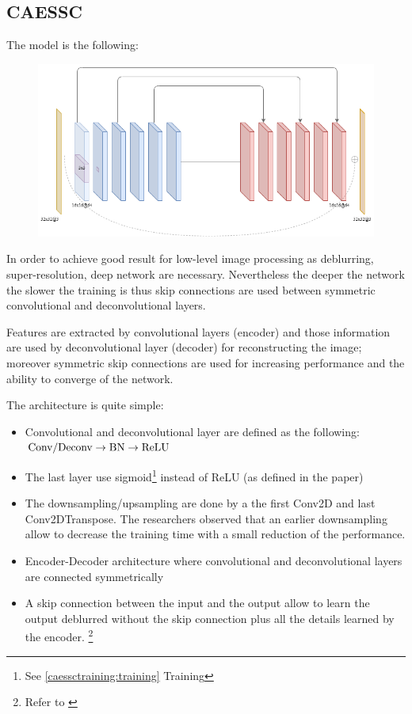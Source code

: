 \subsection{CAESSC}
The model is the following:
\begin{figure}[H]
    \centering
    \includegraphics[scale=0.4]{subsections/caessc/caessc.png}
\end{figure}

In order to achieve good result for low-level image processing as deblurring, super-resolution, deep network are necessary.
Nevertheless the deeper the network the slower the training is thus skip connections are used between symmetric convolutional and deconvolutional layers.

Features are extracted by convolutional layers (encoder) and those information are used by deconvolutional layer (decoder) for reconstructing the image; moreover symmetric  skip connections are used for increasing performance and the ability to converge of the network.

The architecture is quite simple:
\begin{itemize}
    \item Convolutional and deconvolutional layer are defined as the following: $\textnormal{Conv/Deconv} \rightarrow \textnormal{BN} \rightarrow \textnormal{ReLU}$
    \item The last layer use sigmoid\footnote{See \ref{caessctraining:training} Training} instead of ReLU (as defined in the paper)
    \item The downsampling/upsampling are done by a the first Conv2D and last Conv2DTranspose.
    The researchers observed that an earlier downsampling allow to decrease the training time with a small reduction of the performance.
    \item Encoder-Decoder architecture where convolutional and deconvolutional layers are connected symmetrically
    \item A skip connection between the input and the output allow to learn the output deblurred without the skip connection plus all the details learned by the encoder. \footnote{Refer to \cite[4.1 Analysis of the architecture]{CAESSC}} 
\end{itemize}

